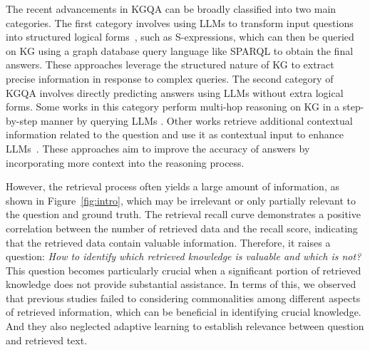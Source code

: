 The recent advancements in KGQA can be broadly classified into two main categories.
The first category involves using LLMs to transform input questions into structured logical forms~\cite{chatkbqa}, such as S-expressions, which can then be queried on KG using a graph database query language like SPARQL to obtain the final answers. These approaches leverage the structured nature of KG to extract precise information in response to complex queries.
The second category of KGQA involves directly predicting answers using LLMs without extra logical forms. Some works in this category perform multi-hop reasoning on KG in a step-by-step manner by querying LLMs \cite{TOG}. Other works retrieve additional contextual information related to the question and use it as contextual input to enhance LLMs~\cite{G-retriever,RoG}. These approaches aim to improve the accuracy of answers by incorporating more context into the reasoning process.
% 

However, the retrieval process often yields a large amount of information, as shown in Figure~\ref{fig:intro}, which may be irrelevant or only partially relevant to the question and ground truth. The retrieval recall curve demonstrates a positive correlation between the number of retrieved data and the recall score, indicating that the retrieved data contain valuable information.
Therefore, it raises a question: \textit{How to identify which retrieved knowledge is valuable and which is not?} This question becomes particularly crucial when a significant portion of retrieved knowledge does not provide substantial assistance. In terms of this, we observed that previous studies \cite{decaf,GMT-KBQA} failed to considering commonalities among different aspects of retrieved information, which can be beneficial in identifying crucial knowledge. And they also neglected adaptive learning to establish relevance between question and retrieved text.
 
